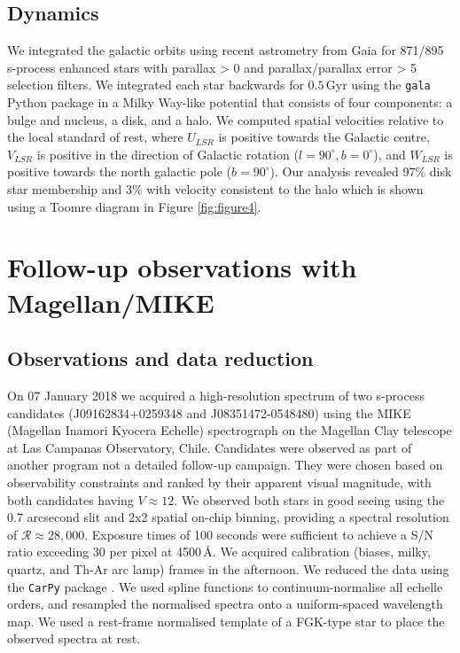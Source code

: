 \documentclass[a4paper,fleqn,usenatbib]{mnras}
\begin{document}
\subsection{Dynamics}
We integrated the galactic orbits using recent astrometry from Gaia \citep{gaia2016,gaia2018b, cropper2018, katz2018, lindegren2018, sartoretti2018} for 871/895 s-process enhanced stars with parallax > 0 and parallax/parallax error > 5 selection filters. We integrated each star backwards for $0.5\,\textrm{Gyr}$ using the \texttt{gala} Python package \citep{price2017} in a Milky Way-like potential \citep{mwpotential2014} that consists of four components: a \citet{hernquist1990} bulge and nucleus, a \citet{miyamoto1975} disk, and a \citet{nfw1997} halo. We computed spatial velocities relative to the local standard of rest, where $U_{LSR}$ is positive towards the Galactic centre, $V_{LSR}$ is positive in the direction of Galactic rotation ($l=90^{\circ}, b=0^{\circ}$), and $W_{LSR}$ is positive towards the north galactic pole ($b=90^{\circ}$). Our analysis revealed 97\% disk star membership and 3\% with velocity consistent to the halo which is shown using a Toomre diagram in Figure \ref{fig:figure4}.

\section{Follow-up observations with Magellan/MIKE} \label{sec:observations}

\subsection{Observations and data reduction}
On 07 January 2018 we acquired a high-resolution spectrum of two s-process candidates (J09162834+0259348 and J08351472-0548480) using the MIKE (Magellan Inamori Kyocera Echelle) \citep{bernstein2003} spectrograph on the Magellan Clay telescope \citep{schectman2003} at Las Campanas Observatory, Chile. Candidates were observed as part of another program not a detailed follow-up campaign. They were chosen based on observability constraints and ranked by their apparent visual magnitude, with both candidates having $V \approx 12$. We observed both stars in good seeing using the 0.7 arcsecond slit and 2x2 spatial on-chip binning, providing a spectral resolution of $\mathcal{R} \approx 28,000$. Exposure times of 100 seconds were sufficient to achieve a S/N ratio exceeding 30 per pixel at 4500\,\AA. We acquired calibration (biases, milky, quartz, and Th-Ar arc lamp) frames in the afternoon. We reduced the data using the \texttt{CarPy} package \citep{kelson2000}. We used spline functions to continuum-normalise all echelle orders, and resampled the normalised spectra onto a uniform-spaced wavelength map. We used a rest-frame normalised template of a FGK-type star to place the observed spectra at rest.
\end{document}
